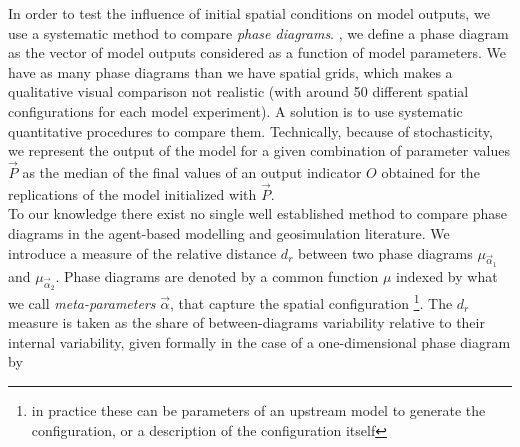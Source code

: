 \documentclass[3p,times,procedia]{elsarticle}
\begin{document}
In order to test the influence of initial spatial conditions on model outputs, we use a systematic method to compare \emph{phase diagrams}.  \citet{Gauvinetal2009}, we define a phase diagram as the vector of  model outputs considered as a function of model parameters. We have as many phase diagrams than we have spatial grids, which makes a qualitative visual comparison not realistic (with around 50 different spatial configurations for each model experiment). A solution is to use systematic quantitative procedures to compare them.
Technically, because of stochasticity, we represent the output of the model for a given combination of parameter values $\vec{P}$ as the median of the final values of an output indicator $O$ obtained for the replications of the model initialized with $\vec{P}$.\\

To our knowledge there exist no single well established method to compare phase diagrams in the agent-based modelling and geosimulation literature. We introduce a measure of the relative distance $d_r$ between two phase diagrams $\mu_{\vec{\alpha}_1}$ and $\mu_{\vec{\alpha}_2}$. Phase diagrams are denoted by a common function $\mu$ indexed by what we call \emph{meta-parameters} $\vec{\alpha}$, that capture the spatial configuration \footnote{in practice these can be parameters of an upstream model to generate the configuration, or a description of the configuration itself}. The $d_r$ measure is taken as the share of between-diagrams variability relative to their internal variability, given formally in the case of a one-dimensional phase diagram by

\end{document}
